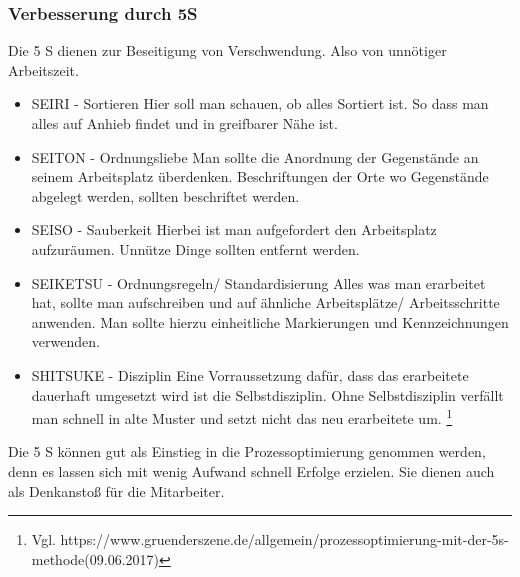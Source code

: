 \documentclass[00_ToyotaProduktionssystem.tex]{subfiles}
\begin{document}
\subsubsection{Verbesserung durch 5S}
Die 5 S dienen zur Beseitigung von Verschwendung. Also von unnötiger Arbeitszeit.

\begin{itemize}
\item{SEIRI - Sortieren} Hier soll man schauen, ob alles Sortiert ist. So dass man alles auf Anhieb findet und in greifbarer Nähe ist. 
\item{SEITON - Ordnungsliebe} Man sollte die Anordnung der Gegenstände an seinem Arbeitsplatz überdenken. Beschriftungen der Orte wo Gegenstände abgelegt werden, sollten beschriftet werden.
\item{SEISO - Sauberkeit} Hierbei ist man aufgefordert den Arbeitsplatz aufzuräumen. Unnütze Dinge sollten entfernt werden. 
\item{SEIKETSU - Ordnungsregeln/ Standardisierung} Alles was man erarbeitet hat, sollte man aufschreiben und auf ähnliche Arbeitsplätze/ Arbeitsschritte anwenden.  Man sollte hierzu einheitliche Markierungen und Kennzeichnungen verwenden. 
\item{SHITSUKE - Disziplin} Eine Vorraussetzung dafür, dass das erarbeitete dauerhaft umgesetzt wird ist die Selbstdisziplin. Ohne Selbstdisziplin verfällt man schnell in alte Muster und setzt nicht das neu erarbeitete um.
\footnote{Vgl.  https://www.gruenderszene.de/allgemein/prozessoptimierung-mit-der-5s-methode(09.06.2017)}
\end{itemize}

Die 5 S können gut als Einstieg in die Prozessoptimierung genommen werden, denn es lassen sich mit wenig Aufwand schnell Erfolge erzielen. Sie dienen auch als Denkanstoß für die Mitarbeiter.
\end{document}
